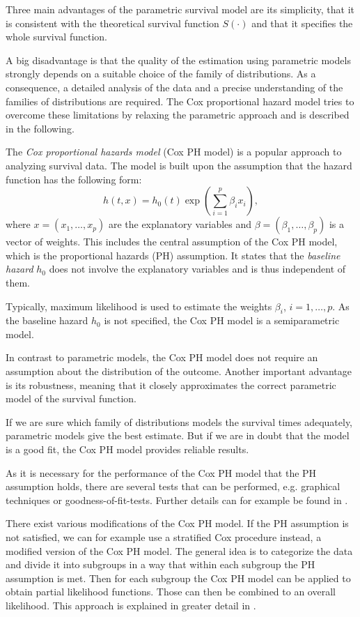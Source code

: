 \documentclass[12pt, a4paper]{scrartcl}
\theoremstyle{definition}
\theoremstyle{plain}
\numberwithin{equation}{section}
\numberwithin{figure}{section}
\numberwithin{table}{section}
\begin{document}
	Three main advantages of the parametric survival model are its simplicity,  that it is consistent with the theoretical survival function $S(\cdot)$ and that it specifies the whole survival function.
	
	A big disadvantage is that the quality of the estimation using parametric models strongly depends on a suitable choice of the family of distributions.
	As a consequence, a detailed analysis of the data and a precise understanding of the families of distributions are required.
	The Cox proportional hazard model tries to overcome these limitations by relaxing the parametric approach and is described in the following.
	
	The \emph{Cox proportional hazards model} (Cox PH model) is a popular approach to analyzing survival data.
	The model is built upon the assumption that the hazard function has the following form:
	\begin{equation*}
	h(t,x) = h_0(t) \exp \left(\sum_{i=1}^p \beta_i x_i\right),
	\end{equation*}
	where $x=(x_1,\dots,x_p)$ are the explanatory variables and $\beta = (\beta_1,\dots, \beta_p)$ is a vector of weights.
	This includes the central assumption of the Cox PH model, which is the proportional hazards (PH) assumption.
	It states that the \emph{baseline hazard} $h_0$ does not involve the explanatory variables and is thus independent of them.

	Typically, maximum likelihood is used to estimate the weights $\beta_i$, $i=1,\dots ,p$.
	As the baseline hazard $h_0$ is not specified, the Cox PH model is a semiparametric model.
	
	In contrast to parametric models, the Cox PH model does not require an assumption about the distribution of the outcome.
	Another important advantage is its robustness, meaning that it closely approximates the correct parametric model of the survival function.
	
	If we are sure which family of distributions models the survival times adequately, parametric models give the best estimate.
	But if we are in doubt that the model is a good fit, the Cox PH model provides reliable results.
	
	As it is necessary for the performance of the Cox PH model that the PH assumption holds, there are several tests that can be performed, e.g. graphical techniques or goodness-of-fit-tests.
	Further details can for example be found in \citet*[Chapter~3]{sabook}.
	
	There exist various modifications of the Cox PH model.
	If the PH assumption is not satisfied, we can for example use a stratified Cox procedure instead, a modified version of the Cox PH model.
	The general idea is to categorize the data and divide it into subgroups in a way that within each subgroup the PH assumption is met.
	Then for each subgroup the Cox PH model can be applied to obtain partial likelihood functions.
	Those can then be combined to an overall likelihood.
	This approach is explained in greater detail in \citet*[Chapter~5]{sabook}.
\end{document}
